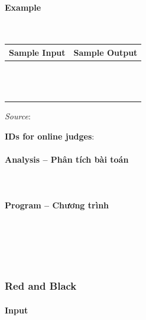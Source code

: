 \documentclass{article}
\begin{document}
\paragraph{Example}\mbox{} \\

\begin{table}[h]
    \centering
    \begin{tabular}{|l|r|}
        \hline
        \textbf{Sample Input} & \textbf{Sample Output} \\
        \hline
		&  \\ 
		&  \\ 
		&  \\ 
		&  \\ 
		&  \\
		&  \\ 
		&  \\ 
		&  \\ 
		&  \\ 
		&  \\ 
		&  \\ 
		&  \\
		&  \\ \hline
    \end{tabular}
\end{table}

\textit{Source}: 

\textbf{IDs for online judges}:

\paragraph{Analysis -- Phân tích bài toán} \mbox{} \\



\paragraph{Program -- Chương trình} \mbox{} \\


\begin{lstlisting}
	
	
\end{lstlisting}
\subsubsection{Red and Black}
 

\paragraph{Input} \mbox{} \\
\end{document}
